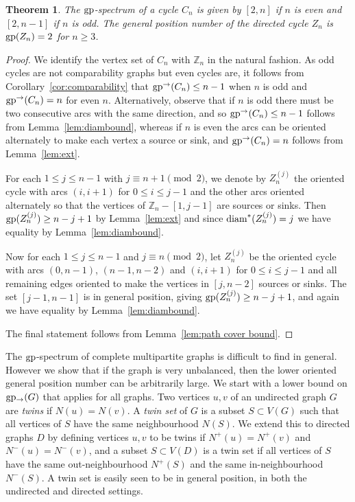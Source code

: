 \documentclass[a4paper,12pt]{article}
\newtheorem{theorem}{Theorem}[section]
\theoremstyle{definition}
\newcommand{\gp}{{\rm gp}}
\newcommand{\diam}{{\rm diam}}
\newcommand{\ugp}{{\rm gp^{\rightarrow }}}
\newcommand{\lgp}{{\rm gp_{\rightarrow }}}
\begin{document}
	\begin{theorem}
		The $\gp $-spectrum of a cycle $C_n$ is given by $[2,n]$ if $n$ is even and $[2,n-1]$ if $n$ is odd. The general position number of the directed cycle $Z_n$ is $\gp (Z_n) = 2$ for $n \geq 3$.
	\end{theorem}
	\begin{proof}
		We identify the vertex set of $C_n$ with $\mathbb{Z}_n$ in the natural fashion. As odd cycles are not comparability graphs but even cycles are, it follows from Corollary~\ref{cor:comparability} that $\ugp (C_n) \leq n-1$ when $n$ is odd and $\ugp (C_n) = n$ for even $n$. Alternatively, observe that if $n$ is odd there must be two consecutive arcs with the same direction, and so $\ugp (C_n) \leq n-1$ follows from Lemma~\ref{lem:diambound}, whereas if $n$ is even the arcs can be oriented alternately to make each vertex a source or sink, and $\ugp (C_n) = n$ follows from Lemma~\ref{lem:ext}.  
		
		For each $1 \leq j \leq n-1$ with $j \equiv n+1 \pmod{2}$, we denote by $Z_n^{(j)}$ the oriented cycle with arcs $(i,i+1)$ for $0 \leq i \leq j-1$ and the other arcs oriented alternately so that the vertices of $\mathbb{Z}_n-[1,j-1]$ are sources or sinks. Then $\gp (Z_n^{(j)}) \geq n-j+1$ by Lemma~\ref{lem:ext} and since $\diam ^*(Z_n^{(j)}) = j$ we have equality by Lemma~\ref{lem:diambound}.
		
		Now for each $1 \leq j \leq n-1$ and $j \equiv n \pmod{2}$, let $Z_n^{(j)}$ be the oriented cycle with arcs $(0,n-1)$, $(n-1,n-2)$ and $(i,i+1)$ for $0 \leq i \leq j-1$ and all remaining edges oriented to make the vertices in $[j,n-2]$ sources or sinks. The set $[j-1,n-1]$ is in general position, giving $\gp (Z_n^{(j)}) \geq n-j+1$, and again we have equality by Lemma~\ref{lem:diambound}.
		
		The final statement follows from Lemma~\ref{lem:path cover bound}.
	\end{proof}
	
	The $\gp $-spectrum of complete multipartite graphs is difficult to find in general. However we show that if the graph is very unbalanced, then the lower oriented general position number can be arbitrarily large. We start with a lower bound on $\lgp (G)$ that applies for all graphs. Two vertices $u,v$ of an undirected graph $G$ are \emph{twins} if $N(u) = N(v)$. A \emph{twin set} of $G$ is a subset $S \subset V(G)$ such that all vertices of $S$ have the same neighbourhood $N(S)$. We extend this to directed graphs $D$ by defining vertices $u,v$ to be twins if $N^+(u) = N^+(v)$ and $N^-(u) = N^-(v)$, and a subset $S \subset V(D)$ is a twin set if all vertices of $S$ have the same out-neighbourhood $N^+(S)$ and the same in-neighbourhood $N^-(S)$. A twin set is easily seen to be in general position, in both the undirected and directed settings.
	
\end{document}
